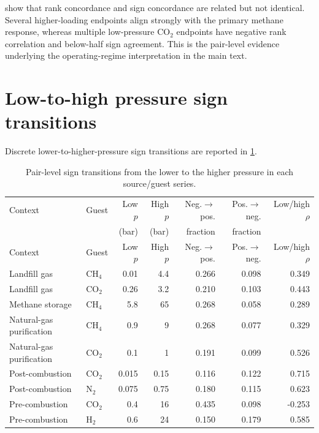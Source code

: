 \documentclass[11pt,a4paper]{article}
\begin{document}
 show that rank concordance and sign concordance are
related but not identical. Several higher-loading endpoints align strongly with the
primary methane response, whereas multiple low-pressure CO$_2$ endpoints have
negative rank correlation and below-half sign agreement. This is the pair-level
evidence underlying the operating-regime interpretation in the main text.

\section{Low-to-high pressure sign transitions}
\label{sec:transitions}

Discrete lower-to-higher-pressure sign transitions are reported in \cref{tab:S13}.


\begingroup
\small
\setlength{\tabcolsep}{3.5pt}
\begin{longtable}{p{}lrrrrr}
\caption{Pair-level sign transitions from the lower to the higher pressure in each
source/guest series.}\label{tab:S13}\\
\toprule
Context & Guest & Low $p$ & High $p$ & Neg.$\rightarrow$pos. &
Pos.$\rightarrow$neg. & Low/high $\rho$ \\
 & & (bar) & (bar) & fraction & fraction & \\
\midrule
\endfirsthead
\toprule
Context & Guest & Low $p$ & High $p$ & Neg.$\rightarrow$pos. &
Pos.$\rightarrow$neg. & Low/high $\rho$ \\
\midrule
\endhead
Landfill gas & CH$_4$ & 0.01 & 4.4 & 0.266 & 0.098 & 0.349 \\
Landfill gas & CO$_2$ & 0.26 & 3.2 & 0.210 & 0.103 & 0.443 \\
Methane storage & CH$_4$ & 5.8 & 65 & 0.268 & 0.058 & 0.289 \\
Natural-gas purification & CH$_4$ & 0.9 & 9 & 0.268 & 0.077 & 0.329 \\
Natural-gas purification & CO$_2$ & 0.1 & 1 & 0.191 & 0.099 & 0.526 \\
Post-combustion & CO$_2$ & 0.015 & 0.15 & 0.116 & 0.122 & 0.715 \\
Post-combustion & N$_2$ & 0.075 & 0.75 & 0.180 & 0.115 & 0.623 \\
Pre-combustion & CO$_2$ & 0.4 & 16 & 0.435 & 0.098 & -0.253 \\
Pre-combustion & H$_2$ & 0.6 & 24 & 0.150 & 0.179 & 0.585 \\
\bottomrule
\end{longtable}
\endgroup
\end{document}

